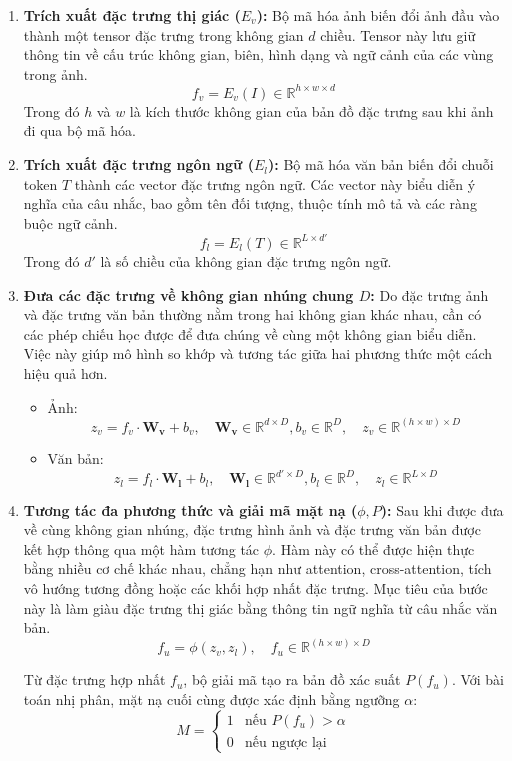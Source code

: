 \begin{enumerate}
    \item \textbf{Trích xuất đặc trưng thị giác ($E_v$):} Bộ mã hóa ảnh biến đổi ảnh đầu vào thành một tensor đặc trưng trong không gian $d$ chiều. Tensor này lưu giữ thông tin về cấu trúc không gian, biên, hình dạng và ngữ cảnh của các vùng trong ảnh.
    \[
        f_v = E_v(I) \in \mathbb{R}^{h \times w \times d}
    \]
    Trong đó $h$ và $w$ là kích thước không gian của bản đồ đặc trưng sau khi ảnh đi qua bộ mã hóa.

    \item \textbf{Trích xuất đặc trưng ngôn ngữ ($E_l$):} Bộ mã hóa văn bản biến đổi chuỗi token $T$ thành các vector đặc trưng ngôn ngữ. Các vector này biểu diễn ý nghĩa của câu nhắc, bao gồm tên đối tượng, thuộc tính mô tả và các ràng buộc ngữ cảnh.
    \[
        f_l = E_l(T) \in \mathbb{R}^{L \times d'}
    \]
    Trong đó $d'$ là số chiều của không gian đặc trưng ngôn ngữ.

    \item \textbf{Đưa các đặc trưng về không gian nhúng chung $D$:} Do đặc trưng ảnh và đặc trưng văn bản thường nằm trong hai không gian khác nhau, cần có các phép chiếu học được để đưa chúng về cùng một không gian biểu diễn. Việc này giúp mô hình so khớp và tương tác giữa hai phương thức một cách hiệu quả hơn.
    \begin{itemize}
        \item Ảnh:
        \[
            z_v = f_v \cdot \boldsymbol{W_v} + b_v, \quad \boldsymbol{W_v} \in \mathbb{R}^{d \times D}, b_v \in \mathbb{R}^D, \quad z_v \in \mathbb{R}^{(h \times w) \times D}
        \]
        \item Văn bản:
        \[
            z_l = f_l \cdot \boldsymbol{W_l} + b_l, \quad \boldsymbol{W_l} \in \mathbb{R}^{d' \times D}, b_l \in \mathbb{R}^D, \quad z_l \in \mathbb{R}^{L \times D}
        \]
    \end{itemize}

    \item \textbf{Tương tác đa phương thức và giải mã mặt nạ ($\phi, P$):} Sau khi được đưa về cùng không gian nhúng, đặc trưng hình ảnh và đặc trưng văn bản được kết hợp thông qua một hàm tương tác $\phi$. Hàm này có thể được hiện thực bằng nhiều cơ chế khác nhau, chẳng hạn như attention, cross-attention, tích vô hướng tương đồng hoặc các khối hợp nhất đặc trưng. Mục tiêu của bước này là làm giàu đặc trưng thị giác bằng thông tin ngữ nghĩa từ câu nhắc văn bản.
    \[
        f_u = \phi(z_v, z_l), \quad f_u \in \mathbb{R}^{(h \times w) \times D}
    \]

    Từ đặc trưng hợp nhất $f_u$, bộ giải mã tạo ra bản đồ xác suất $P(f_u)$. Với bài toán nhị phân, mặt nạ cuối cùng được xác định bằng ngưỡng $\alpha$:
    \[
    M = 
    \begin{cases}
        1 & \text{nếu } P(f_u) > \alpha \\
        0 & \text{nếu ngược lại}
    \end{cases}
    \]
\end{enumerate}

